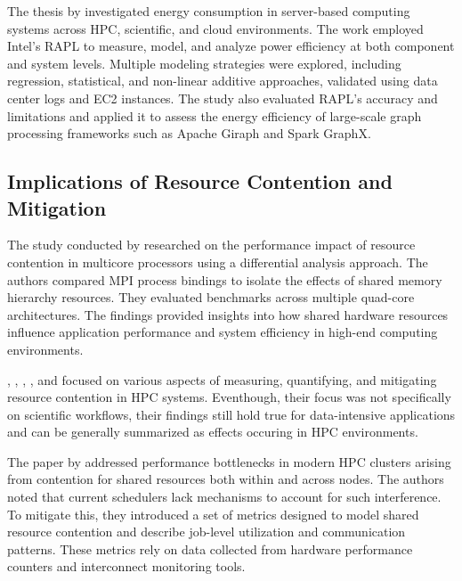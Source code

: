 The thesis by \cite{khan2018energy} investigated energy consumption in server-based computing systems across HPC, scientific, and cloud environments. The work employed Intel's RAPL to measure, model, and analyze power efficiency at both component and system levels. Multiple modeling strategies were explored, including regression, statistical, and non-linear additive approaches, validated using data center logs and EC2 instances. The study also evaluated RAPL's accuracy and limitations and applied it to assess the energy efficiency of large-scale graph processing frameworks such as Apache Giraph and Spark GraphX.

\subsection{Implications of Resource Contention and Mitigation}
\label{sec:relatedwork_contention}

The study conducted by \cite{5470399} researched on the performance impact of resource contention in multicore processors using a differential analysis approach. The authors compared MPI process bindings to isolate the effects of shared memory hierarchy resources. They evaluated benchmarks across multiple quad-core architectures. The findings provided insights into how shared hardware resources influence application performance and system efficiency in high-end computing environments.

\cite{10.1145/1958746.1958815}, \cite{10.1145/1958746.1958815}, \cite{Blagodurov_2012}, \cite{7349920}, \cite{10.1007/978-3-031-48803-0_31} and \cite{10.1002/cpe.3187} focused on various aspects of measuring, quantifying, and mitigating resource contention in HPC systems. Eventhough, their focus was not specifically on scientific workflows, their findings still hold true for data-intensive applications and can be generally summarized as effects occuring in HPC environments.

The paper by \cite{10.1145/1958746.1958815} addressed performance bottlenecks in modern HPC clusters arising from contention for shared resources both within and across nodes. The authors noted that current schedulers lack mechanisms to account for such interference. To mitigate this, they introduced a set of metrics designed to model shared resource contention and describe job-level utilization and communication patterns. These metrics rely on data collected from hardware performance counters and interconnect monitoring tools.

